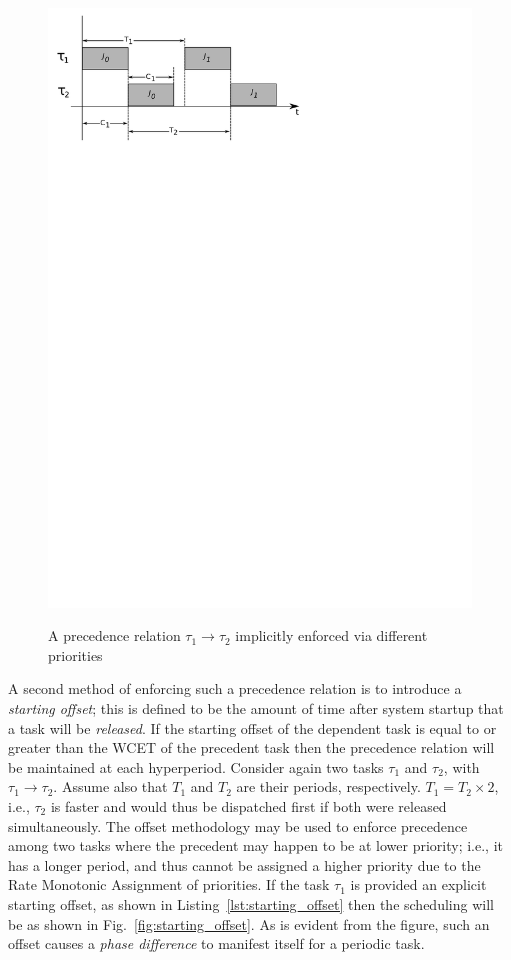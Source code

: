 \begin{figure}
\centering
\includegraphics[scale=0.75]{figs/precedence_priority}
\label{fig:precendence_priority}
\caption{A precedence relation $\tau_1 \to \tau_2$ implicitly enforced
  via different priorities}
\end{figure}

A second method of enforcing such a precedence relation is to
introduce a \emph{starting offset}; this is defined to be the amount
of time after system startup that a task will be \emph{released}. If
the starting offset of the dependent task is equal to or greater than
the WCET of the precedent task then the precedence relation will be
maintained at each hyperperiod. Consider again two tasks $\tau_1$ and
$\tau_2$, with $\tau_1 \to \tau_2$. Assume also that $T_1$ and $T_2$
are their periods, respectively. $T_1 = T_2 \times 2$, i.e., $\tau_2$
is faster and would thus be dispatched first if both were released
simultaneously. The offset methodology may be used to enforce
precedence among two tasks where the precedent may happen to be at
lower priority; i.e., it has a longer period, and thus cannot be
assigned a higher priority due to the Rate Monotonic Assignment of
priorities. If the task $\tau_1$ is provided an explicit starting
offset, as shown in Listing~\ref{lst:starting_offset} then the
scheduling will be as shown in Fig.~\ref{fig:starting_offset}. As is
evident from the figure, such an offset causes a \emph{phase
  difference} to manifest itself for a periodic task.

